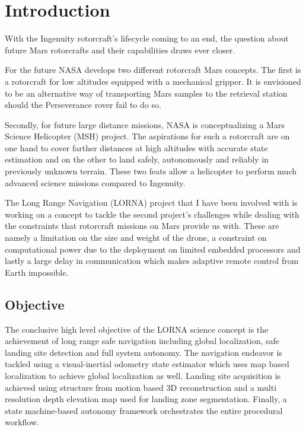 \chapter{Introduction}
\label{sec:introduction}

With the Ingenuity rotorcraft's lifecycle coming to an end, the question about future Mars rotorcrafts and their capabilities draws ever closer.

For the future NASA develops two different rotorcraft Mars concepts. The first is a rotorcraft for low altitudes equipped with a mechanical gripper. It is envisioned to be an alternative way of transporting Mars samples to the retrieval station should the Perseverance rover fail to do so.

Secondly, for future large distance missions, NASA is conceptualizing a Mars Science Helicopter (MSH) project. The aspirations for such a rotorcraft are on one hand to cover farther distances at high altitudes with accurate state estimation and on the other to land safely, autonomously and reliably in previously unknown terrain. These two feats allow a helicopter to perform much advanced science missions compared to Ingenuity. 

The Long Range Navigation (LORNA) project that I have been involved with is working on a concept to tackle the second project's challenges while dealing with the constraints that rotorcraft missions on Mars provide us with. These are namely a limitation on the size and weight of the drone, a constraint on computational power due to the deployment on limited embedded processors and lastly a large delay in communication which makes adaptive remote control from Earth impossible.

\section{Objective}

The conclusive high level objective of the LORNA science concept is the achievement of long range safe navigation including global localization, safe landing site detection and full system autonomy. The navigation endeavor is tackled using a visual-inertial odometry state estimator which uses map based localization to achieve global localization as well. Landing site acquisition is achieved using structure from motion based 3D reconstruction and a multi resolution depth elevation map used for landing zone segmentation. Finally, a state machine-based autonomy framework orchestrates the entire procedural workflow.

